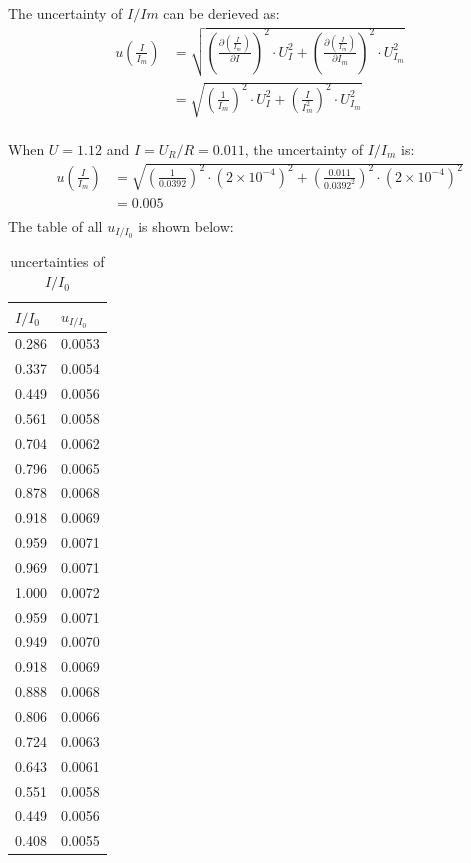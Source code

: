 \documentclass[12pt, a4paper]{article}
\begin{document}
The uncertainty of $I/Im$ can be derieved as:
\begin{align*}
	u\left(\frac{I}{I_m}\right) &= \sqrt{\left(\frac{\partial(\frac{I}{I_m})}{\partial I}\right)^2\cdot U_I^2 + \left(\frac{\partial(\frac{I}{I_m})}{\partial I_m}\right)^2\cdot U_{I_m}^2}\\
								&= \sqrt{\left(\frac{1}{I_m}\right)^2\cdot U_I^2 + \left(\frac{I}{I_m^2}\right)^2\cdot U^2_{I_m}}\\
\end{align*}

When $U = 1.12$ and $I = U_R/R = 0.011$, the uncertainty of $I/I_m$ is:
\begin{align*}
	u\left(\frac{I}{I_m}\right) &= \sqrt{\left(\frac{1}{0.0392}\right)^2 \cdot (2 \times 10^{-4})^2 + (\frac{0.011}{0.0392^2})^2 \cdot(2\times10^{-4})^2}\\
								&= 0.005\\
\end{align*}
The table of all $u_{I/I_0}$ is shown below:
\begin{table}[H]
	\centering
	\begin{tabular}{|l|l|}
	\hline
	$I/I_0$ & $u_{I/I_0}$ \\ \hline
	0.286   & 0.0053      \\ \hline
	0.337   & 0.0054      \\ \hline
	0.449   & 0.0056      \\ \hline
	0.561   & 0.0058      \\ \hline
	0.704   & 0.0062      \\ \hline
	0.796   & 0.0065      \\ \hline
	0.878   & 0.0068      \\ \hline
	0.918   & 0.0069      \\ \hline
	0.959   & 0.0071      \\ \hline
	0.969   & 0.0071      \\ \hline
	1.000   & 0.0072      \\ \hline
	0.959   & 0.0071      \\ \hline
	0.949   & 0.0070      \\ \hline
	0.918   & 0.0069      \\ \hline
	0.888   & 0.0068      \\ \hline
	0.806   & 0.0066      \\ \hline
	0.724   & 0.0063      \\ \hline
	0.643   & 0.0061      \\ \hline
	0.551   & 0.0058      \\ \hline
	0.449   & 0.0056      \\ \hline
	0.408   & 0.0055      \\ \hline
	\end{tabular}
	\caption{uncertainties of $I/I_0$}
\end{table}
\end{document}

